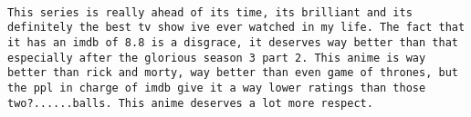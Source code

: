 \documentclass[
]{article}
\begin{document}
\begin{verbatim}
                                                                                                                                                                                                                                                                                                                                                                                                                                                                                                                                                                                                                                                                                                                                                                                                                                                                                                                                                                                                                                                                                                                                                                                                                                                                                                                                                                                                                                                                                                                                                                                                                                                                                                                                                                                                                                                                                                                                                                                                                                                                                                                                                                                                                                                                                                                                                                                                                                                                                                                                                                                                                                                                                                                                                                                   This series is really ahead of its time, its brilliant and its definitely the best tv show ive ever watched in my life. The fact that it has an imdb of 8.8 is a disgrace, it deserves way better than that especially after the glorious season 3 part 2. This anime is way better than rick and morty, way better than even game of thrones, but the ppl in charge of imdb give it a way lower ratings than those two?......balls. This anime deserves a lot more respect.

\end{verbatim}
\end{document}
